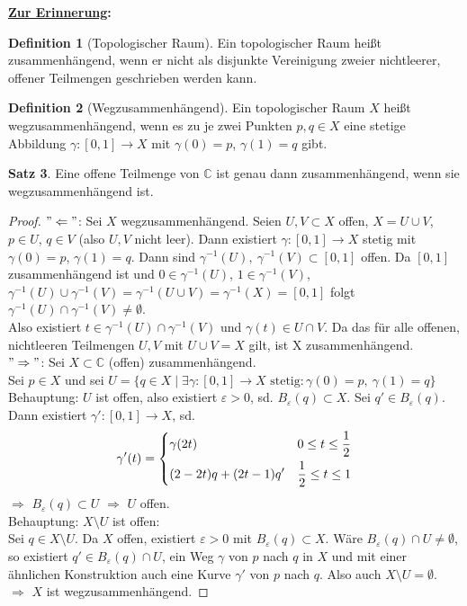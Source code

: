 \documentclass[11pt,titlepage]{article}
\theoremstyle{definition}
\newtheorem{theorem}{Satz}[section]
\newtheorem{definition}[theorem]{Definition}
\theoremstyle{remark}
\begin{document}
	\textbf{\underline{Zur Erinnerung}:}
	
	\begin{definition}[Topologischer Raum]
		Ein topologischer Raum heißt zusammenhängend, wenn er nicht als disjunkte Vereinigung zweier 
		nichtleerer, offener Teilmengen geschrieben werden kann.
	\end{definition}
	
	\begin{definition}[Wegzusammenhängend]
		Ein topologischer Raum $X$ heißt wegzusammenhängend, wenn es zu je zwei Punkten 
		$p,q\in X$ eine stetige Abbildung $\gamma :[0,1]\to X$ mit $\gamma (0)=p$, $\gamma (1)=q$ 
		gibt.
	\end{definition}
	
	\begin{theorem}
		Eine offene Teilmenge von $\mathbb{C}$ ist genau dann zusammenhängend, wenn sie 
		wegzusammenhängend ist.
	\end{theorem}
	\begin{proof}
		$"\Leftarrow"$: Sei $X$ wegzusammenhängend. Seien $U,V\subset X$ offen, $X=U\cup V$, 
		$p\in U$, $q\in V$ (also $U,V$ nicht leer). Dann existiert $\gamma :[0,1]\to X$ stetig mit 
		$\gamma (0)=p$, $\gamma (1)=q$. Dann sind $\gamma ^{-1}(U),\ \gamma^{-1}(V)\subset 
    		[0,1]$ offen. Da $[0,1]$ zusammenhängend ist und $0\in \gamma^{-1}(U)$, 
		$1\in \gamma^{-1}(V)$, \\
		$\gamma^{-1}(U)\cup\gamma^{-1}(V)=\gamma^{-1}(U\cup V)=\gamma^{-1}(X)=[0,1]$ folgt 
		$\gamma^{-1}(U)\cap \gamma^{-1}(V) \neq \emptyset$. \\Also existiert $t\in \gamma^{-1}(U)
		\cap\gamma^{-1}(V)$ und $\gamma(t)\in U\cap V$. Da das für alle offenen, nichtleeren 
		Teilmengen $U,V$ mit $U\cup V=X$ gilt, ist X zusammenhängend.\\
		$"\Rightarrow"$: Sei $X\subset \mathbb{C}$ (offen) zusammenhängend. \\Sei $p\in X$ und sei 
		$U=\{ q\in X \mid \exists \gamma :[0,1]\to X \text{ stetig}:\gamma(0)=p,\ \gamma(1)=q \}$\\
		Behauptung: $U$ ist offen, also existiert $\varepsilon>0$, sd. $B_{\varepsilon}(q)\subset X$. 
		Sei $q'\in B_{\varepsilon}(q)$. Dann existiert $\gamma':[0,1]\to X$, sd. 
		\[ \gamma'(t)= \begin{dcases} \gamma(2t) & 0\leq t\leq \frac{1}{2} \\ (2-2t)q + (2t-1)q' & 
			\frac{1}{2} \leq t\leq 1 \end{dcases} \]
		$\Rightarrow$ $B_{\varepsilon}(q)\subset U$ $\Rightarrow$ $U$ offen.\\
		Behauptung: $X\setminus U$ ist offen: \\
		Sei $q\in X\setminus U$. Da $X$ offen, existiert $\varepsilon >0$ mit 
		$B_{\varepsilon}(q)\subset X$. Wäre $B_{\varepsilon}(q)\cap U \neq \emptyset$, so existiert 
		$q'\in B_{\varepsilon}(q)\cap U$, ein Weg $\gamma$ von $p$ nach $q$ in $X$ und mit einer 
		ähnlichen Konstruktion auch eine Kurve $\gamma'$ von $p$ nach $q$. Also auch 
		$X\setminus U = \emptyset$.\\
		$\Rightarrow$ $X$ ist wegzusammenhängend.	
	\end{proof}
	
\end{document}
